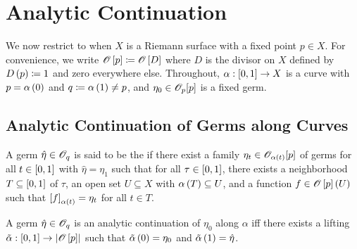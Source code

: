 \documentclass[../Moduli_Spaces_of_Riemann_Surfaces.tex]{subfiles}
\begin{document}
    \section{Analytic Continuation}
    We now restrict to when $X$ is a Riemann surface with a fixed point $p\in X$. For convenience, we write $\mathscr{O}\left[p\right]\coloneqq\mathscr{O}\left[D\right]$ where $D$ is the divisor on $X$ defined by $D\left(p\right)\coloneqq1$ and zero everywhere else. Throughout, $\alpha:\left[0,1\right]\to X$ is a curve with $p=\alpha\left(0\right)$ and $q\coloneqq\alpha\left(1\right)\neq p$, and $\eta_0\in\mathscr{O}_p\!\left[p\right]$ is a fixed germ.
    \subsection{Analytic Continuation of Germs along Curves}
    \begin{definition}
        A germ $\hat{\eta}\in\mathscr{O}_q$ is said to be the  if there exist a family $\eta_t\in\mathscr{O}_{\alpha\left(t\right)}\!\left[p\right]$ of germs for all $t\in\left[0,1\right]$ with $\hat{\eta}=\eta_1$ such that for all $\tau\in\left[0,1\right]$, there exists a neighborhood $T\subseteq\left[0,1\right]$ of $\tau$, an open set $U\subseteq X$ with $\alpha\left(T\right)\subseteq U$, and a function $f\in\mathscr{O}\left[p\right]\left(U\right)$ such that $\left[f\right]_{\alpha\left(t\right)}=\eta_t$ for all $t\in T$.
    \end{definition}
    \begin{proposition}\label{2.3:prp:analytic_continuation_iff_lifting}
        A germ $\hat{\eta}\in\mathscr{O}_q$ is an analytic continuation of $\eta_0$ along $\alpha$ iff there exists a lifting $\tilde{\alpha}:\left[0,1\right]\to\left|\mathscr{O}\left[p\right]\right|$ such that $\tilde{\alpha}\left(0\right)=\eta_0$ and $\tilde{\alpha}\left(1\right)=\hat{\eta}$.
    \end{proposition}
\end{document}
